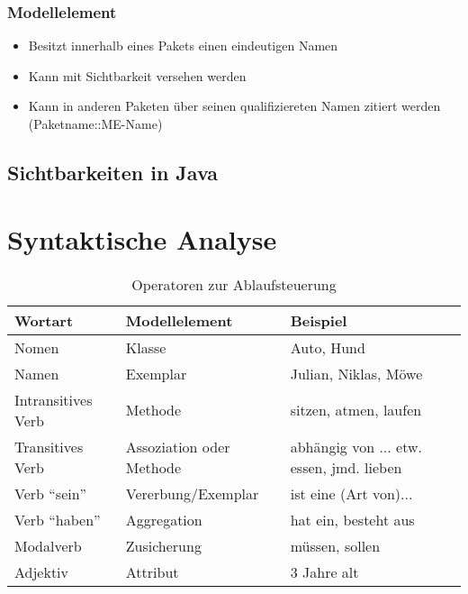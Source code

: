 \subsubsection{Modellelement}
\begin{itemize}
    \item Besitzt innerhalb eines Pakets einen eindeutigen Namen
    \item Kann mit Sichtbarkeit versehen werden
    \item Kann in anderen Paketen über seinen qualifiziereten Namen zitiert werden (Paketname::ME-Name)
\end{itemize}


\subsection{Sichtbarkeiten in Java}

\newpage
\section{Syntaktische Analyse}
\begin{table}[h]
\begin{tabular}{l|l|l}
Wortart            & Modellelement            & Beispiel                                 \\
\hline
Nomen              & Klasse                   & Auto, Hund                               \\
Namen              & Exemplar                 & Julian, Niklas, Möwe                     \\
Intransitives Verb & Methode                  & sitzen, atmen, laufen                    \\
Transitives Verb   & Assoziation oder Methode & abhängig von ... etw. essen, jmd. lieben \\
Verb ``sein''      & Vererbung/Exemplar       & ist eine (Art von)...                    \\
Verb ``haben''     & Aggregation              & hat ein, besteht aus                     \\
Modalverb          & Zusicherung              & müssen, sollen                           \\
Adjektiv           & Attribut                 & 3 Jahre alt               
\end{tabular}
\caption{Operatoren zur Ablaufsteuerung}
\label{tab:ablaufsteuerung2}
\end{table}

